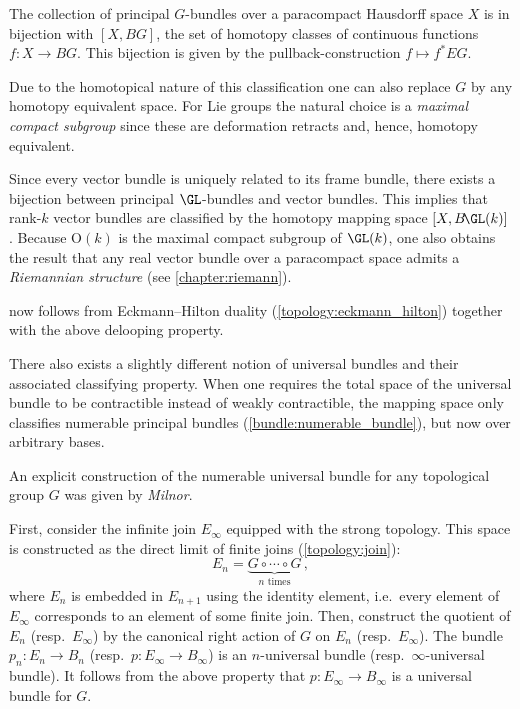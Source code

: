     \begin{property}[Classification]\label{bundle:classification}
        The collection of principal $G$-bundles over a paracompact Hausdorff space $X$ is in bijection with $[X,BG]$, the set of homotopy classes of continuous functions $f:X\rightarrow BG$. This bijection is given by the pullback-construction $f\mapsto f^*EG$.

        Due to the homotopical nature of this classification one can also replace $G$ by any homotopy equivalent space. For Lie groups the natural choice is a \textit{maximal compact subgroup} since these are deformation retracts and, hence, homotopy equivalent.
    \end{property}
    \begin{result}
        Since every vector bundle is uniquely related to its frame bundle, there exists a bijection between principal $\GL$-bundles and vector bundles. This implies that rank-$k$ vector bundles are classified by the homotopy mapping space $[X,B\!\GL(k)]$. Because $\mathrm{O}(k)$ is the maximal compact subgroup of $\GL(k)$, one also obtains the result that any real vector bundle over a paracompact space admits a \textit{Riemannian structure} (see \cref{chapter:riemann}).

         now follows from Eckmann--Hilton duality (\cref{topology:eckmann_hilton}) together with the above delooping property.
    \end{result}
    \begin{remark}
        There also exists a slightly different notion of universal bundles and their associated classifying property. When one requires the total space of the universal bundle to be contractible instead of weakly contractible, the mapping space only classifies numerable principal bundles (\cref{bundle:numerable_bundle}), but now over arbitrary bases.
    \end{remark}

    An explicit construction of the numerable universal bundle for any topological group $G$ was given by \textit{Milnor}.
    \begin{construct}
        First, consider the infinite join $E_\infty$ equipped with the strong topology. This space is constructed as the direct limit of finite joins (\cref{topology:join}): \[E_n=\underbrace{G\circ\cdots\circ G}_{n\text{ times}}\,,\] where $E_n$ is embedded in $E_{n+1}$ using the identity element, i.e.~every element of $E_\infty$ corresponds to an element of some finite join. Then, construct the quotient of $E_n$ (resp.~$E_\infty$) by the canonical right action of $G$ on $E_n$ (resp.~$E_\infty$). The bundle $p_n:E_n\rightarrow B_n$ (resp.~$p:E_\infty\rightarrow B_\infty$) is an $n$-universal bundle (resp.~$\infty$-universal bundle). It follows from the above property that $p:E_\infty\rightarrow B_\infty$ is a universal bundle for $G$.
    \end{construct}

